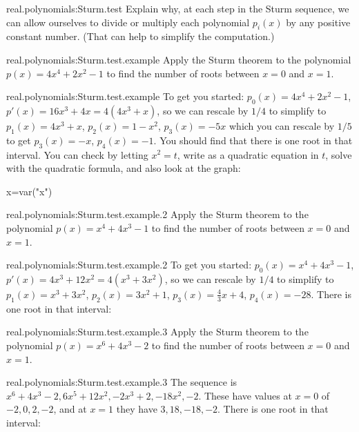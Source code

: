 \begin{problem}{real.polynomials:Sturm.test}
Explain why, at each step in the Sturm sequence, we can allow ourselves to divide or multiply each polynomial \(p_i(x)\) by any positive constant number. (That can help to simplify the computation.)
\end{problem}
\begin{problem}{real.polynomials:Sturm.test.example}
Apply the Sturm theorem to the polynomial \(p(x)=4x^4+2x^2-1\) to find the number of roots between \(x=0\) and \(x=1\).
\end{problem}
\begin{answer}{real.polynomials:Sturm.test.example}
To get you started: \(p_0(x)=4x^4+2x^2-1\), \(p'(x)=16x^3+4x=4(4x^3+x)\), so we can rescale by \(1/4\) to simplify to \(p_1(x)=4x^3+x\), \(p_2(x)=1-x^2\), \(p_3(x)=-5x\) which you can rescale by \(1/5\) to get \(p_3(x)=-x\), \(p_4(x)=-1\).
You should find that there is one root in that interval. You can check by letting \(x^2=t\), write as a quadratic equation in \(t\), solve with the quadratic formula, and also look at the graph:
\begin{center}
\begin{sagesilent}
x=var("x")
\end{sagesilent}
\end{center}
\end{answer}
\begin{problem}{real.polynomials:Sturm.test.example.2}
Apply the Sturm theorem to the polynomial \(p(x)=x^4+4x^3-1\) to find the number of roots between \(x=0\) and \(x=1\).
\end{problem}
\begin{answer}{real.polynomials:Sturm.test.example.2}
To get you started: \(p_0(x)=x^4+4x^3-1\), \(p'(x)=4x^3 + 12x^2=4(x^3+3x^2)\), so we can rescale by \(1/4\) to simplify to \(p_1(x)=x^3+3x^2\), \(p_2(x)=3x^2 + 1\), \(p_3(x)=\frac{4}{3}x + 4\), \(p_4(x)= -28\).
There is one root in that interval:
\begin{center}
\end{center}
\end{answer}
\begin{problem}{real.polynomials:Sturm.test.example.3}
Apply the Sturm theorem to the polynomial \(p(x)=x^6+4x^3-2\) to find the number of roots between \(x=0\) and \(x=1\).
\end{problem}
\begin{answer}{real.polynomials:Sturm.test.example.3}
The sequence is \(x^6+4x^3-2, 6x^5+12x^2, -2x^3+2, -18x^2, -2\). 
These have values at \(x=0\) of \(-2, 0, 2, -2\), and at \(x=1\) they have \(3, 18, -18, -2\).
There is one root in that interval:
\begin{center}
\end{center}
\end{answer}
